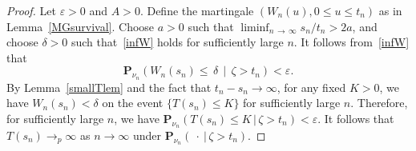 \documentclass[10pt]{amsart}
\theoremstyle{definition}\newtheorem{defi}[theo]{Definition}\newtheorem{rema}[theo]{Remark}\newtheorem{exam}[theo]{Example}\newtheorem{exem}[theo]{Example}\newtheorem{nota}[theo]{Notation}
\newcommand*\eps{\varepsilon}
\renewcommand*\P{\mathbf{P}}
\newcommand{\1} {\mathds{1}}
\begin{document}
\begin{proof}
Let $\eps > 0$ and $A > 0$. Define the martingale $(W_n(u), 0 \leq u \leq t_n)$ as in Lemma~\ref{MGsurvival}. Choose $a > 0$ such that $\liminf_{n\,\rightarrow\,\infty} s_n/t_n > 2a$, and choose $\delta > 0$ such that~\eqref{infW} holds for sufficiently large $n$. It follows from~\eqref{infW} that
\begin{equation}\label{Wsn}
\P_{\nu_n} \left(W_n(s_n) \leq \,\delta \,\middle|\, \zeta > t_n\right) < \eps.
\end{equation}
By Lemma~\ref{smallTlem} and the fact that $t_n - s_n \rightarrow \infty$, for any fixed $K > 0$, we have $W_n(s_n) < \delta$ on the event $\{T(s_n) \leq K\}$ for sufficiently large $n$. Therefore, for sufficiently large $n$, we have $\P_{\nu_n}(T(s_n) \leq K\,|\,\zeta > t_n) < \eps$. It follows that $T(s_n) \rightarrow_p \infty$ as $n \rightarrow \infty$ under $\P_{\nu_n}(\: \cdot \:|\,\zeta > t_n)$.


\end{proof}
\end{document}
